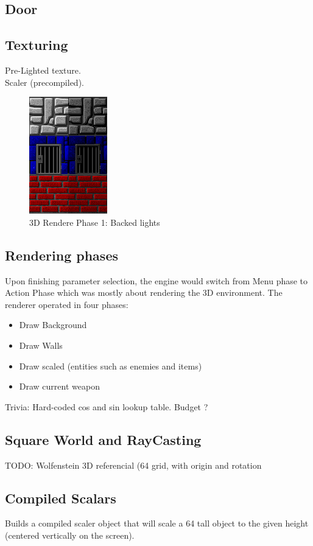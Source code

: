 \documentclass[book.tex]{subfiles}
\begin{document}
\subsection{Door}
\subsection{Texturing}
Pre-Lighted texture.\\
Scaler (precompiled).\\
  \begin{figure}[H]
\centering
 \includegraphics[scale=3.3]{imgs/baked_lights.png}
 \caption{3D Rendere Phase 1: Backed lights} \label{fig:backee_lights}
 \end{figure}

\subsection{Rendering phases}

Upon finishing parameter selection, the engine would switch from Menu phase to Action Phase which was mostly about rendering the 3D environment. The renderer operated in four phases:
\begin{itemize}
   \item Draw Background
   \item Draw Walls
   \item Draw scaled (entities such as enemies and items)
   \item Draw current weapon
\end{itemize}


Trivia: Hard-coded cos and sin lookup table. Budget ? 

\subsection{Square World and RayCasting}
TODO: Wolfenstein 3D referencial (64 grid, with origin and rotation
\subsection{Compiled Scalars}
Builds a compiled scaler object that will scale a 64 tall object to the given height (centered vertically on the screen).
\\

\end{document}
